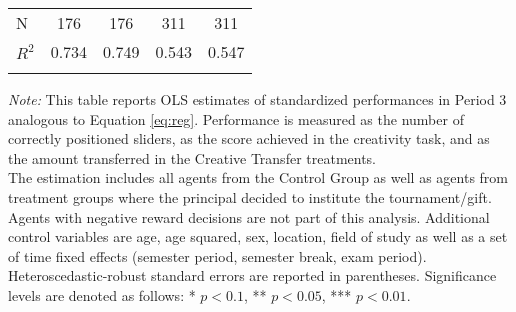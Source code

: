 \begin{table}[h]
\begin{center}
{\begin{tabular}{lcccc}
\hline\noalign{\smallskip}
N      &         176   &         176   &         311   &         311     \\
$R^2$               &       0.734   &       0.749   &       0.543   &       0.547     \\
\hline\hline\noalign{\medskip}
\end{tabular}}
\begin{minipage}{0.8\textwidth}
\footnotesize
\vspace{2mm}
{\it Note:} This table reports OLS estimates of standardized performances in Period 3 analogous to Equation \ref{eq:reg}. Performance is measured as the number of correctly positioned sliders, as the score achieved in the  creativity task, and as the amount transferred in the Creative Transfer treatments.\\
The estimation includes all agents from the Control Group as well as agents from treatment groups where the principal decided to institute the tournament/gift. Agents with negative reward decisions are not part of this analysis. Additional control variables are age, age squared, sex, location, field of study as well as a set of time fixed  effects (semester period, semester break, exam period). Heteroscedastic-robust standard errors are reported in parentheses. Significance levels are denoted as follows: * $p < 0.1$, ** $p < 0.05$, *** $p < 0.01$.\\
\end{minipage}
\end{center}
\label{tab:Period3}
\end{table}

